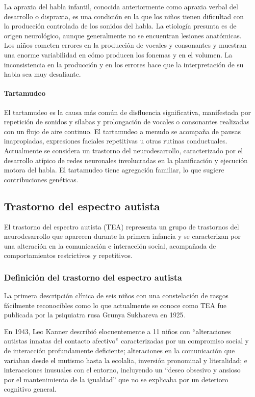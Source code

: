 \documentclass[11pt,letterpaper]{report}
\begin{document}
La apraxia del habla infantil, conocida anteriormente como apraxia verbal del
desarrollo o dispraxia, es una condición en la que los niños tienen
dificultad con la producción controlada de los sonidos del habla. La etiología
presunta es de origen neurológico, aunque generalmente no se encuentran
lesiones anatómicas. Los niños cometen errores en la producción de vocales y
consonantes y muestran una enorme variabilidad en cómo producen los fonemas y
en el volumen. La inconsistencia en la producción y en los errores hace que la
interpretación de su habla sea muy desafiante. \cite{Feldman44}

\paragraph{Tartamudeo}
El tartamudeo es la causa más común de disfluencia significativa, manifestada
por repetición de sonidos y sílabas y prolongación de vocales o consonantes
realizadas con un flujo de aire continuo. El tartamudeo a menudo se acompaña
de pausas inapropiadas, expresiones faciales repetitivas u otras rutinas
conductuales. Actualmente se considera un trastorno del neurodesarrollo,
caracterizado por el desarrollo atípico de redes neuronales involucradas en la
planificación y ejecución motora del habla. El tartamudeo tiene agregación
familiar, lo que sugiere contribuciones genéticas. \cite{Feldman44}

\subsection{Trastorno del espectro autista}
El trastorno del espectro autista (TEA) representa un grupo de trastornos del
neurodesarrollo que aparecen durante la primera infancia y se caracterizan por
una alteración en la comunicación e interacción social, acompañada de
comportamientos restrictivos y repetitivos.

\subsubsection{Definición del trastorno del espectro autista}
La primera descripción clínica de seis niños con una constelación de rasgos
fácilmente reconocibles como lo que actualmente se conoce como TEA fue
publicada por la psiquiatra rusa Grunya Sukhareva en 1925. \cite{Myers2025}

En 1943, Leo Kanner describió elocuentemente a 11 niños con ``alteraciones
autistas innatas del contacto afectivo'' caracterizadas por un compromiso
social y de interacción profundamente deficiente; alteraciones en la
comunicación que variaban desde el mutismo hasta la ecolalia, inversión
pronominal y literalidad; e interacciones inusuales con el entorno, incluyendo
un ``deseo obsesivo y ansioso por el mantenimiento de la igualdad'' que no se
explicaba por un deterioro cognitivo general. \cite{Myers2025}
\end{document}
